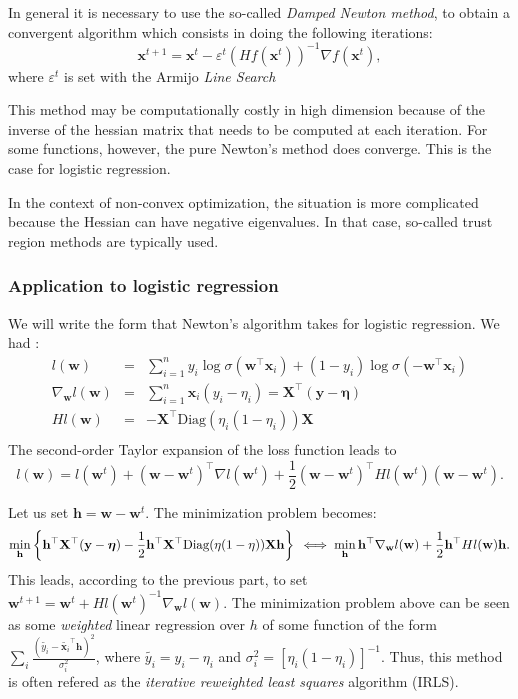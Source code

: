 \documentclass[12pt]{report}	%
\def\ts{\top}
\def\XX{\mathbf{X}}
\def\wb{\mathbf{w}}
\def\xb{\mathbf{x}}
\def\yb{\mathbf{y}}
\def\hb{\mathbf{h}}
\def\Diag{\text{Diag}}
\def\etab{\boldsymbol \eta}
\begin{document}
In general it is necessary to use the so-called \emph{Damped Newton method}, to obtain a convergent algorithm which consists in doing the following iterations:
$$
 \xb^{t+1}=\xb^{t}-\varepsilon^{t}(Hf(\xb^t))^{-1}\nabla f (\xb^t), 
$$
where $\varepsilon ^t$ is set with the Armijo \emph{Line Search}

This method may be computationally costly in high dimension because of the inverse of the hessian matrix that needs to be computed at each iteration. For some functions, however, the pure Newton's method does converge. This is the case for logistic regression.

In the context of non-convex optimization, the situation is more complicated because the Hessian can have negative eigenvalues. In that case, so-called trust region methods are typically used.

\subsubsection{Application to logistic regression}

We will write the form that Newton's algorithm takes for logistic regression. We had :
\begin{eqnarray*}
l({\wb}) &=& \sum_{i=1}^n{y_i\log\sigma({\wb}^{\ts}\xb_i)+(1-y_i)\log\sigma(-{\wb}^{\ts}\xb_i)}\\
\nabla _{\wb}l({\wb}) &=& \sum_{i=1}^n \xb_i(y_i-\eta_i) = \XX^{\ts}(\yb-\etab)\\
Hl({\wb}) &=& -\XX^{\ts}\Diag(\eta_i(1-\eta_i))\XX\\
\end{eqnarray*}
The second-order Taylor expansion of the loss function leads to
$$
l({\wb}) = l({\wb}^t) + ({\wb}-{\wb}^t)^{\ts}\nabla l ({\wb}^t) + \frac{1}{2}({\wb}-{\wb}^t)^{\ts}Hl({\wb}^t)({\wb}-{\wb}^t).
$$

Let us set $\hb=\wb-{\wb}^t$. The minimization problem becomes:
$$
\min_{\hb}  \left\lbrace \hb^{\ts}\XX^{\ts}(\yb-\etab)-\frac{1}{2} \hb^{\ts}\XX^{\ts}\Diag(\eta (1-\eta))\XX \hb \right\rbrace \\
\iff \min_{\hb} \hb^{\ts} \nabla_{\wb} l({\wb}) + \frac{1}{2}\hb^{\ts}Hl({\wb})\hb.
$$
This leads, according to the previous part, to set ${\wb}^{t+1}={\wb}^{t} + Hl({\wb}^{t})^{-1}\nabla_{\wb}l({\wb})$. The minimization problem above can be seen as some \emph{weighted} linear regression over $h$ of some function of the form $\sum_i{\frac{(\tilde{y_i}-\tilde{\xb_i}^{\ts}\hb)^2}{\sigma_i^2}}$, where $\tilde{y_i} = y_i-\eta_i$ and $\sigma_i^2 = [\eta_i(1-\eta_i)]^{-1}$. Thus, this method is often refered as the \emph{iterative reweighted least squares} algorithm (IRLS).
~\\
\end{document}

